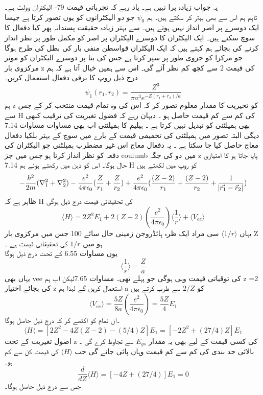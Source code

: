 یہ جواب زیادہ برا نہیں ہے۔
یاد رہے کہ تجرباتی قیمت 79- الیکٹران وولٹ ہے۔\\
تاہم ہم اس سے بھی بہتر کر سکتے ہیں۔
ہم
\(\psi_{0}\)
جو دو الیکٹرانوں کو یوں تصور کرتا ہے جیسا ایک دوسرے پر اصر انداز نہیں ہوتے ہیں۔
سے بہتر زیادہ حقیقت پسندانہ پھر کیا دفعال کا سوچ سکتے ہیں۔
ایک الیکٹران کا دوسرے الیکٹران پر اصر کو مکمل طور پر نظر انداز کرنے کی بجائے ہم کہتے ہیں کہ ایک الیکٹران قواسطن منفی بار کی بطل کی طرح ہوگا جو مرکزا کو جزوی طور پر سپر کرتا ہے جس کی بنا پر دوسرے الیکٹران کو موثر مرکزوی بار z کی قیمت 2 سے کچھ کم نظر آئے گی۔ اس سے ہمیں خیال آتا ہے کہ ہم درج ذیل روپ کا برقی دفعال استعمال کریں۔
\[\psi_{1}(r_{1},r_{2})=\frac{Z^{3}}{\pi a^{3}e^{-Z(r_{1}+r_{2})/a}}\]
ہم z کو تخیریت کا مقدار معلوم تصور کر کہ اس کی وہ تمام قیمت منتخب کر کے جس سے H کی کم سے کم قیمت حاصل ہو ۔
دیہان رہے کہ فضول تغیریت کی ترقیب کبھی بھی ہمیلٹنی کو تبدیل نہیں کرتا ہے ۔
ہیلیم کا ہمیلٹنی اب بھی مساوات 
مساوات 7.14
دیگی البتہ
تصور میں ہمیلٹنی کی تخمیمی قیمت کے بارے میں سوچ کے بہتر بلکیا دفعال معاج حاصل کیا جا سکتا ہے ۔
یہ دفعال معاج اس غیر مضطرب ہمیلٹنی جو الیکٹران کی دفعہ کو نظر انداز کرتا ہو جس میں جز coulumb میں دو کی جگہ z پایا جاتا ہو کا امتیازی حال ہوگا۔
اس کو ذہن میں رکھتے ہوئے ہم 7.14 H کو روپ میں لکھتے ہیں 
\[-\frac{\hbar^{2}}{2m}(\nabla_{1}^{2}+\nabla_{2}^{2})-\frac{e^{2}}{4\pi\epsilon_{0}}(\frac{Z}{r_{1}}+\frac{Z}{r_{2}})+\frac{e^{2}}{4\pi\epsilon_{0}}(\frac{(Z-2)}{r_{1}}+\frac{(Z-2)}{r_{2}}+\frac{1}{\abs{\vec{r_{1}}-\vec{r}_{2}}})\]
ظاہر ہے کہ H کی تحقیقاتی قیمت درج ذیل ہوگی 
\[\langle H \rangle = 2Z^{2}E_{1}+2(Z-2)(\frac{e^{2}}{4\pi\epsilon_{0}})\langle \frac{1}{r}\rangle + \langle V_{ee} \rangle \]
یہاں
\(\langle 1/r \rangle \) 
سی مراد ایک ظرہ ہائڈروجن زمینی حال سائے 100 جس میں مرکزوی بار 
Z
 ہو میں
\(1/r\)
کی تحقیقاتی قیمت ہے ۔\\
یوں مساوات 6.55 کے تحت درج ذیل ہوگا 
\[\langle \frac{1}{r} \rangle = \frac{Z}{a}\]
یہاں بھی vee کی توقیاتی قیمت وہی ہوگی جو پہلے تھی۔
مساوات 7.65لیکن اب ہم z =2 کی بجائے اختیار z استعمال کریں گے لہذا ہم a کو 
\(2/Z\)
 سے ظرب کرتے ہیں 
 \[\langle V_{ee} \rangle =\frac{5Z}{8a}(\frac{e^{2}}{4\pi\epsilon_{0}})=\frac{5Z}{4}E_{1}\]
 ۔ان تمام کو اکٹھے کر کہ درج ذیل حاصل ہوگا 
 \[\langle H \langle =[2Z^{2}-4Z(Z-2)-(5/4)Z]E_{1}=[-2Z^{2}+(27/4)Z]E_{1}\]
اصول تغیریت کے تحت z کی کسی قیمت کے لیے بھی یہ مقدار 
\(E_{gs}\)
سے تجاوظ کرے گی ۔\\
بالائی حد بندی کی کم سے کم قیمت وہاں پائی جانے گی جب
 \(\langle H \rangle \)
 کی قیمت کن سے کم ہو۔\\
\[\frac{d}{dZ}\langle H \rangle =[-4Z+(27/4)]E_{1}=0\]
جس سے درج ذیل حاصل ہوگا۔
